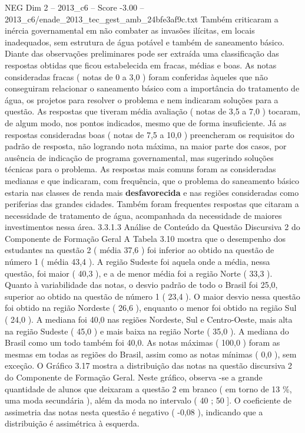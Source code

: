 \begin{textsample}{NEG Dim 2 – 2013\_c6 – Score -3.00 – 2013\_c6/enade\_2013\_tec\_gest\_amb\_24bfe3af9c.txt}
Também criticaram a inércia governamental em não combater as invasões ilícitas, em locais inadequados, sem estrutura de água potável e também de saneamento básico.
Diante das observações preliminares pode ser extraída uma classificação das respostas obtidas que ficou estabelecida em fracas, médias e boas.
As notas consideradas fracas ( notas de 0 a 3,0 ) foram conferidas àqueles que não conseguiram relacionar o saneamento básico com a importância do tratamento de água, os projetos para resolver o problema e nem indicaram soluções para a questão.
As respostas que tiveram média avaliação ( notas de 3,5 a 7,0 ) tocaram, de algum modo, nos pontos indicados, mesmo que de forma insuficiente.
Já as respostas consideradas boas ( notas de 7,5 a 10,0 ) preencheram os requisitos do padrão de resposta, não logrando nota máxima, na maior parte dos casos, por ausência de indicação de programa governamental, mas sugerindo soluções técnicas para o problema.
As respostas mais comuns foram as consideradas medianas e que indicaram, com frequência, que o problema do saneamento básico estaria nas classes de renda mais \textbf{desfavorecida} e nas regiões consideradas como periferias das grandes cidades.
Também foram frequentes respostas que citaram a necessidade de tratamento de água, acompanhada da necessidade de maiores investimentos nessa área. 3.3.1.3 Análise de Conteúdo da Questão Discursiva 2 do Componente de Formação Geral A Tabela 3.10 mostra que o desempenho dos estudantes na questão 2 ( média 37,6 ) foi inferior ao obtido na questão de número 1 ( média 43,4 ).
A região Sudeste foi aquela onde a média, nessa questão, foi maior ( 40,3 ), e a de menor média foi a região Norte ( 33,3 ).
Quanto à variabilidade das notas, o desvio padrão de todo o Brasil foi 25,0, superior ao obtido na questão de número 1 ( 23,4 ).
O maior desvio nessa questão foi obtido na região Nordeste ( 26,6 ), enquanto o menor foi obtido na região Sul ( 24,0 ).
A mediana foi 40,0 nas regiões Nordeste, Sul e Centro-Oeste, mais alta na região Sudeste ( 45,0 ) e mais baixa na região Norte ( 35,0 ).
A mediana do Brasil como um todo também foi 40,0.
As notas máximas ( 100,0 ) foram as mesmas em todas as regiões do Brasil, assim como as notas mínimas ( 0,0 ), sem exceção.
O Gráfico 3.17 mostra a distribuição das notas na questão discursiva 2 do Componente de Formação Geral.
Neste gráfico, observa -se a grande quantidade de alunos que deixaram a questão 2 em branco ( em torno de 13 \%, uma moda secundária ), além da moda no intervalo ( 40 ; 50 ].
O coeficiente de assimetria das notas nesta questão é negativo ( -0,08 ), indicando que a distribuição é assimétrica à esquerda.

\end{textsample}
